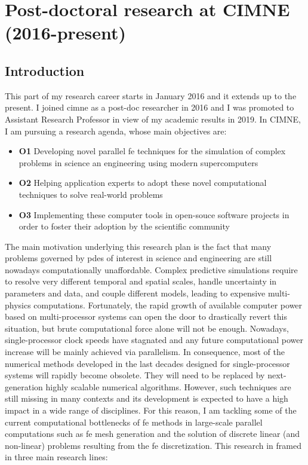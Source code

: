 \documentclass{article}
\begin{document}
\section{Post-doctoral research  at CIMNE (2016-present)} \label{sec:cimne}

\subsection{Introduction}

  This part of my research career starts in January 2016 and it extends up to the present. I joined \ac{cimne} as a post-doc researcher in 2016 and I was promoted to Assistant Research Professor in view of my academic results in 2019. In CIMNE, I am pursuing a research agenda, whose main objectives are:

\begin{itemize}
\item {\bf O1} Developing novel parallel \ac{fe} techniques for the simulation of complex problems in science an engineering using modern supercomputers
\item {\bf O2} Helping application experts to adopt these novel computational techniques to solve real-world problems
\item {\bf O3} Implementing these computer tools in open-souce software projects in order to foster their adoption by the scientific community
\end{itemize}


The main motivation underlying this research plan is the fact that many problems governed by \acp{pde} of interest in science and engineering are still nowadays computationally unaffordable. Complex predictive simulations require to resolve very different temporal and spatial scales, handle uncertainty in parameters and data, and couple different models, leading to expensive multi-physics computations. Fortunately, the rapid growth of available computer power based on multi-processor systems can open the door to drastically revert this situation, but brute computational force alone will not be enough. Nowadays, single-processor clock speeds have stagnated and any future computational power increase will be mainly achieved via parallelism. In consequence, most of the numerical methods developed in the last decades designed for single-processor systems will rapidly become obsolete. They will need to be replaced by next-generation highly scalable numerical algorithms. However, such techniques are still missing in many contexts and its development is expected to have a high impact in a wide range of disciplines. For this reason, I am tackling some of the current computational bottlenecks of \ac{fe} methods in large-scale parallel computations such as \ac{fe} mesh generation and the solution of discrete linear (and non-linear) problems resulting from the \ac{fe} discretization. This research in framed in three main research lines:
\end{document}
